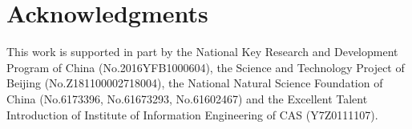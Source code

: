 \documentclass{article}
\begin{document}
\section*{Acknowledgments}
This work is supported in part by
the National Key Research and Development Program of China (No.2016YFB1000604),
the Science and Technology  Project of Beijing (No.Z181100002718004),
the National Natural Science Foundation of China (No.6173396, No.61673293, No.61602467)
 and the Excellent Talent Introduction of Institute of Information Engineering of CAS (Y7Z0111107).


%



%
\end{document}
